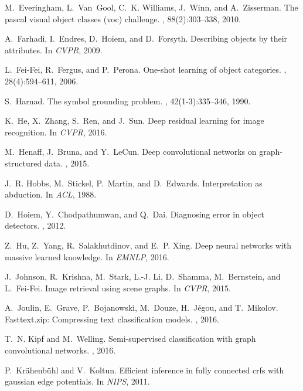 \documentclass[10pt,twocolumn,letterpaper]{article}
\begin{document}
{\begin{thebibliography}{10}
M.~Everingham, L.~Van~Gool, C.~K. Williams, J.~Winn, and A.~Zisserman.
\newblock The pascal visual object classes (voc) challenge.
, 88(2):303--338, 2010.

A.~Farhadi, I.~Endres, D.~Hoiem, and D.~Forsyth.
\newblock Describing objects by their attributes.
\newblock In {\em CVPR}, 2009.

L.~Fei-Fei, R.~Fergus, and P.~Perona.
\newblock One-shot learning of object categories.
, 28(4):594--611, 2006.

S.~Harnad.
\newblock The symbol grounding problem.
, 42(1-3):335--346, 1990.

K.~He, X.~Zhang, S.~Ren, and J.~Sun.
\newblock Deep residual learning for image recognition.
\newblock In {\em CVPR}, 2016.

M.~Henaff, J.~Bruna, and Y.~LeCun.
\newblock Deep convolutional networks on graph-structured data.
, 2015.

J.~R. Hobbs, M.~Stickel, P.~Martin, and D.~Edwards.
\newblock Interpretation as abduction.
\newblock In {\em ACL}, 1988.

D.~Hoiem, Y.~Chodpathumwan, and Q.~Dai.
\newblock Diagnosing error in object detectors.
, 2012.

Z.~Hu, Z.~Yang, R.~Salakhutdinov, and E.~P. Xing.
\newblock Deep neural networks with massive learned knowledge.
\newblock In {\em EMNLP}, 2016.

J.~Johnson, R.~Krishna, M.~Stark, L.-J. Li, D.~Shamma, M.~Bernstein, and
  L.~Fei-Fei.
\newblock Image retrieval using scene graphs.
\newblock In {\em CVPR}, 2015.

A.~Joulin, E.~Grave, P.~Bojanowski, M.~Douze, H.~J{\'e}gou, and T.~Mikolov.
\newblock Fasttext.zip: Compressing text classification models.
, 2016.

T.~N. Kipf and M.~Welling.
\newblock Semi-supervised classification with graph convolutional networks.
, 2016.

P.~Kr{\"a}henb{\"u}hl and V.~Koltun.
\newblock Efficient inference in fully connected crfs with gaussian edge
  potentials.
\newblock In {\em NIPS}, 2011.


\end{thebibliography}}
\end{document}
